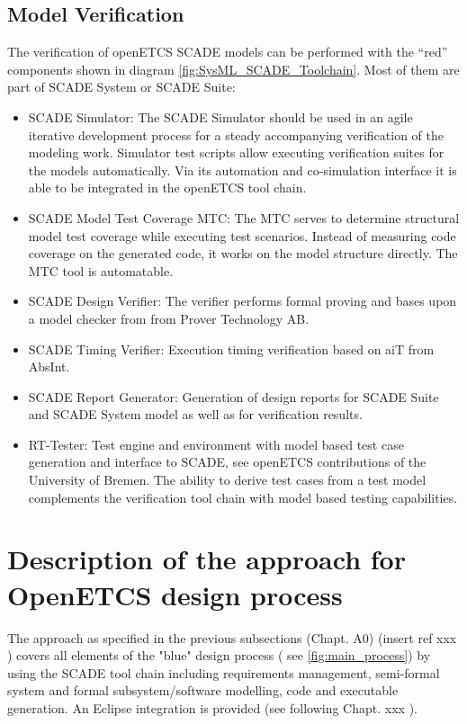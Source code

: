 \subsection{Model Verification}
\label{sec:SysML_SCADE_ModelVerification}

The verification of openETCS SCADE models can be performed with the "`red"' components shown in diagram \ref{fig:SysML_SCADE_Toolchain}. Most of them are part of SCADE System or SCADE Suite:

\begin{itemize}
	\item SCADE Simulator: The SCADE Simulator should be used in an agile iterative development process for a steady accompanying verification of the modeling work. Simulator test scripts allow executing verification suites for the models automatically. Via its automation and co-simulation interface it is able to be integrated in the openETCS tool chain. 
	\item  SCADE Model Test Coverage MTC: The MTC serves to determine structural model test coverage while executing test scenarios. Instead of measuring code coverage on the generated code, it works on the model structure directly. The MTC tool is automatable. 
	\item SCADE Design Verifier: The verifier performs formal proving and bases upon a model checker from from Prover Technology AB.  
	\item SCADE Timing Verifier: Execution timing verification based on aiT from AbsInt.
	\item SCADE Report Generator: Generation of design reports for SCADE Suite and SCADE System model as well as for verification results. 
	\item RT-Tester: Test engine and environment with model based test case generation and interface to SCADE, see openETCS contributions of the University of Bremen. The ability to derive test cases from a test model complements the verification tool chain with model based testing capabilities.  
\end{itemize}
  

\section{Description of the approach for OpenETCS design process}

The approach as specified in the previous subsections (Chapt. A0) (insert ref xxx ) covers all elements of the "blue" design process ( see \ref{fig:main_process}) 
by using the SCADE tool chain including requirements management, semi-formal system and formal subsystem/software modelling, code and executable generation. 
An Eclipse integration is provided (see following Chapt. xxx ). 

